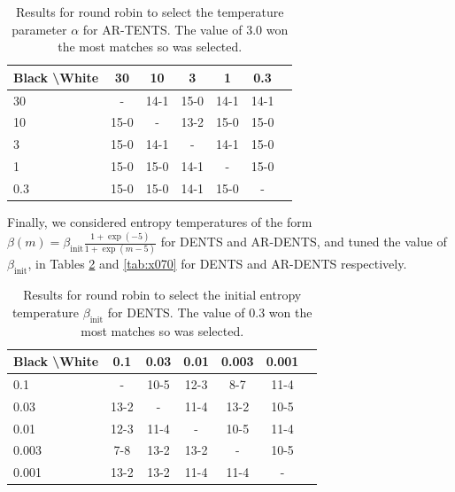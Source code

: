     \begin{table}[]
    \centering
        \begin{tabular}{l|cccccc}
            \textbf{Black \textbackslash White}     & 30  & 10   & 3   & 1    & 0.3    \\ 
            \hline
                                    30            & -     	&  14-1 		& 15-0  		& 14-1  		& 14-1  		\\
                                    10            &  15-0 		& -     	&  13-2		& 15-0  		&  15-0 		\\
                                    3          &  15-0  	&   14-1 	&   -   &  14-1 		&  15-0 		\\
                                    1          &   	15-0	&  15-0 		&  14-1 		& -     	& 15-0  		\\
                                    0.3         &   15-0		&   	15-0	&   14-1		& 15-0  		&   -   	\\    
        \end{tabular}
        \caption{Results for round robin to select the temperature parameter $\alpha$ for AR-TENTS. The value of 3.0 won the most matches so was selected. \label{tab:x060}}
    \end{table}
    
    
    
    
    
    
    
    
    
    
    Finally, we considered entropy temperatures of the form $\beta(m)=\beta_{\text{init}}\frac{1+\exp(-5)}{1+\exp(m-5)}$ for DENTS and AR-DENTS, and tuned the value of $\beta_{\text{init}}$, in Tables \ref{tab:w070} and \ref{tab:x070} for DENTS and AR-DENTS respectively.
    
    
    \begin{table}[]
    \centering
        \begin{tabular}{l|cccccc}
            \textbf{Black \textbackslash White}     & 0.1  & 0.03   & 0.01   & 0.003    & 0.001    \\ 
            \hline
                                    0.1            & - & 10-5 & 12-3 & 8-7 & 11-4  		\\
                                    0.03            & 13-2 & - & 11-4 & 13-2  & 10-5   		\\
                                    0.01            & 12-3 & 11-4 & - & 10-5 & 11-4  		\\
                                    0.003            & 7-8 & 13-2 & 13-2 & - & 10-5  		\\
                                    0.001           & 13-2 & 13-2 & 11-4 & 11-4 &  - 		\\
        \end{tabular}
        \caption{Results for round robin to select the initial entropy temperature $\beta_{\text{init}}$ for DENTS. The value of 0.3 won the most matches so was selected. \label{tab:w070}}
    \end{table}
    
